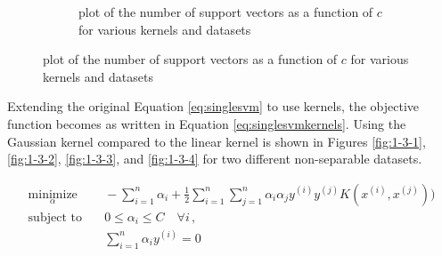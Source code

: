 \documentclass[10pt]{article}
\begin{document}
\begin{figure}[!ht]
\begin{subfigure}[b]{0.46\textwidth}
	\caption{plot of the number of support vectors as a function of $c$ for various kernels and datasets}
	\label{fig:1-3-support-vectors}
\end{subfigure}
\end{figure}

Extending the original Equation \ref{eq:singlesvm} to use kernels, the objective function becomes as written in Equation \ref{eq:singlesvmkernels}. Using the Gaussian kernel compared to the linear kernel is shown in Figures \ref{fig:1-3-1}, \ref{fig:1-3-2}, \ref{fig:1-3-3}, and \ref{fig:1-3-4} for two different non-separable datasets.

\begin{subequations}
\begin{align}
	\underset{\alpha}{\text{minimize}}
		& \quad -\sum_{i = 1}^n \alpha_i + \frac{1}{2} \sum_{i = 1}^n \sum_{j = 1}^n \alpha_i \alpha_j y^{(i)} y^{(j)} K(x^{(i)}, x^{(j)})) \\
	\text{subject to}
		& \quad 0 \leq \alpha_i \leq C \quad \forall i \,, \\
		& \quad \sum_{i = 1}^n \alpha_i y^{(i)} = 0
\end{align}
\label{eq:singlesvmkernels}
\end{subequations}
\end{document}
